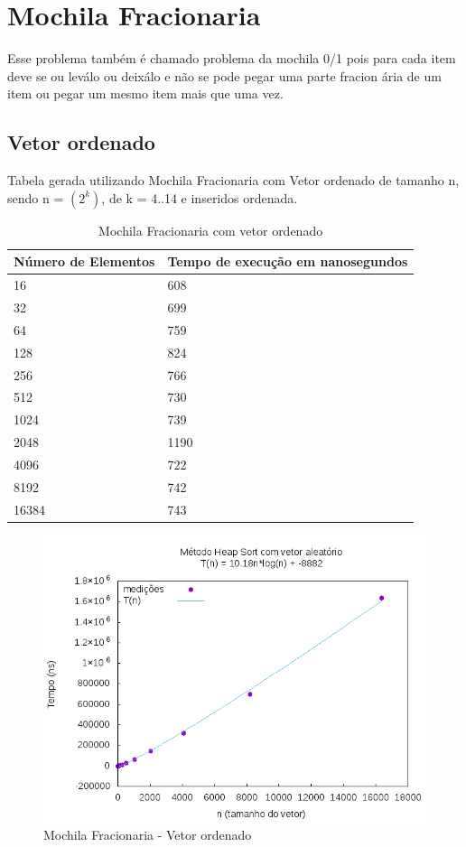 \documentclass[12pt,a4paper,twoside]{report}
\begin{document}
\section{Mochila Fracionaria}

Esse problema também é chamado problema da mochila 0/1 pois para
cada item deve se ou leválo ou deixálo e não se pode pegar uma parte
fracion ária de um item ou pegar um mesmo item mais que uma vez.

\subsection{Vetor ordenado}
Tabela gerada utilizando Mochila Fracionaria com Vetor ordenado de tamanho n, sendo n = $(2^k)$, de k = 4..14 e inseridos ordenada.
\begin{table}[H]
\centering
\caption{Mochila Fracionaria com vetor ordenado}
\label{my-label}
\begin{tabular}{|l|l|}
\hline
\multicolumn{1}{|c|}{\textbf{Número de Elementos}} & \multicolumn{1}{c|}{\textbf{Tempo de execução em nanosegundos}} \\ \hline
16 & 608 \\ \hline
32 & 699 \\ \hline
64 & 759 \\ \hline
128 & 824 \\ \hline
256 & 766 \\ \hline
512 & 730 \\ \hline
1024 & 739 \\ \hline
2048 & 1190 \\ \hline
4096 & 722 \\ \hline
8192 & 742 \\ \hline
16384 & 743 \\ \hline
\end{tabular}
\end{table}

\begin{figure}[H]
    \centering
    \includegraphics[width=0.7\linewidth]{graficos/HeapSort/vIntAleatorio/vIntAleatorio.png}
  \caption{Mochila Fracionaria - Vetor ordenado}
\end{figure}
\end{document}

